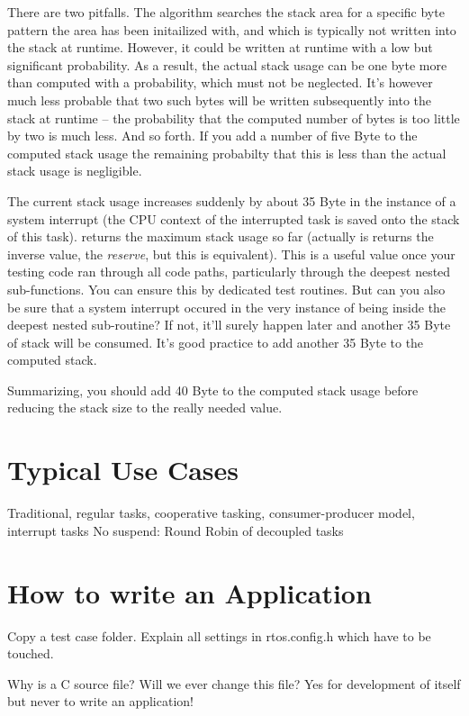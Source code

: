 There are two pitfalls. The algorithm searches the stack area for a
specific byte pattern the area has been initailized with, and which is
typically not written into the stack at runtime. However, it could be
written at runtime with a low but significant probability. As a result,
the actual stack usage can be one byte more than computed with a
probability, which must not be neglected. It's however much less probable
that two such bytes will be written subsequently into the stack at runtime
-- the probability that the computed number of bytes is too little by two
is much less. And so forth. If you add a number of five Byte to the
computed stack usage the remaining probabilty that this is less than the
actual stack usage is negligible.

The current stack usage increases suddenly by about 35 Byte in the
instance of a system interrupt (the CPU context of the interrupted task is
saved onto the stack of this task).  returns
the maximum stack usage so far (actually is returns the inverse value, the
\emph{reserve}, but this is equivalent). This is a useful value once your
testing code ran through all code paths, particularly through the deepest
nested sub-functions. You can ensure this by dedicated test routines. But
can you also be sure that a system interrupt occured in the very instance of
being inside the deepest nested sub-routine? If not, it'll surely happen
later and another 35 Byte of stack will be consumed. It's good practice to
add another 35 Byte to the computed stack.

Summarizing, you should add 40 Byte to the computed stack usage before
reducing the stack size to the really needed value.


\chapter{Typical Use Cases}

Traditional, regular tasks, cooperative tasking, consumer-producer model,
interrupt tasks
No suspend: Round Robin of decoupled tasks


\chapter{How to write an Application}
\label{secHowToWriteApp}

Copy a test case folder. Explain all settings in rtos.config.h which have
to be touched.

Why is \rtos{} a C source file? Will we ever change this file? Yes for
development of \rtos{} itself but never to write an application!

